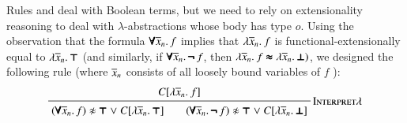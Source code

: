 
Rules  and  deal with Boolean terms,
but we need to rely on extensionality reasoning to deal with $\lambda$-abstractions
whose body has type $o$. Using the observation that the formula $\pmb{\forall} \overline{x}_{n}. \, f$ 
implies that $\lambda \overline{x}_{n}.\> f$ is functional-extensionally equal to $\lambda \overline{x}_{n}.\> \pmb{\top}$ (and similarly, if
$\pmb{\forall} \overline{x}_{n}. \, \pmb{\neg\,} f$, then $\lambda \overline{x}_{n}.\> f \pmb{\approx} \lambda \overline{x}_{n}.\> \pmb{\bot})$, we
designed the following rule (where $\overline{x}_{n}$ consists of all loosely bound variables of $f$ ):
%
$$ \namedinference{Interpret$\lambda$}{C[\lam{\tuplen{x}}{f}]}
{(\iforall {\tuplen{x}}.\, f) \noteq \itrue \llor C[\lam{\tuplen{x}}{\itrue}] \qquad
(\iforall {\tuplen{x}}.\, \inot f) \noteq \itrue \llor C[\lam{\tuplen{x}}{\ifalse}]} $$
%

